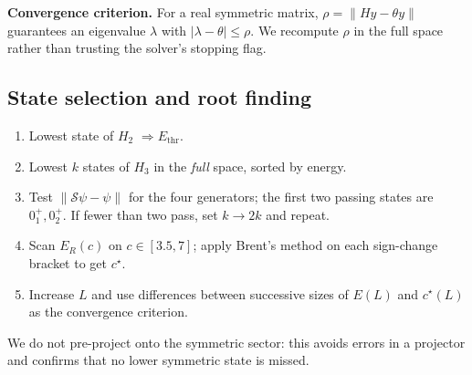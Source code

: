 \documentclass[11pt,a4paper]{article}
\newcommand{\Ethr}{E_{\mathrm{thr}}}
\begin{document}
\textbf{Convergence criterion.} For a real symmetric matrix, $\rho=\|Hy-\theta y\|$ guarantees an eigenvalue $\lambda$ with $|\lambda-\theta|\le\rho$.
We recompute $\rho$ in the full space rather than trusting the solver's stopping flag.

\subsection{State selection and root finding}
\begin{enumerate}
\item Lowest state of $H_2$ $\Rightarrow\Ethr$.
\item Lowest $k$ states of $H_3$ in the \emph{full} space, sorted by energy.
\item Test $\|\mathcal S\psi-\psi\|$ for the four generators; the first two passing states are $0^+_1,0^+_2$. If fewer than two pass, set $k\to2k$ and repeat.
\item Scan $E_R(c)$ on $c\in[3.5,7]$; apply Brent's method on each sign-change bracket to get $c^\star$.
\item Increase $L$ and use differences between successive sizes of $E(L)$ and $c^\star(L)$ as the convergence criterion.
\end{enumerate}
We do not pre-project onto the symmetric sector: this avoids errors in a projector and confirms that no lower symmetric state is missed.

\end{document}
